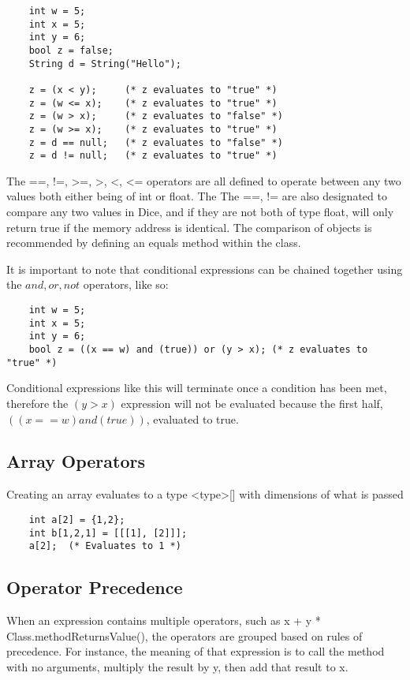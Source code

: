 \begin{homeworkProblem}
	\begin{verbatim}
	int w = 5;
	int x = 5;
	int y = 6;
	bool z = false;
	String d = String("Hello");
	
	z = (x < y);     (* z evaluates to "true" *)
	z = (w <= x);    (* z evaluates to "true" *)
	z = (w > x);     (* z evaluates to "false" *)
	z = (w >= x);    (* z evaluates to "true" *)
	z = d == null;   (* z evaluates to "false" *)
	z = d != null;   (* z evaluates to "true" *)
	\end{verbatim}
	
	The ==, !=, \textgreater=, \textgreater, \textless, \textless= operators are all defined to operate between any two values both either being of int or float. The The ==, != are also designated to compare any two values in Dice, and if they are not both of type float, will only return true if the memory address is identical. The comparison of objects is recommended by defining an equals method within the class. 
	
	It is important to note that conditional expressions can be chained together using the $and, or, not$ operators, like so:
	\begin{verbatim}
	int w = 5;
	int x = 5;
	int y = 6;
	bool z = ((x == w) and (true)) or (y > x); (* z evaluates to "true" *)
	\end{verbatim}
	
	Conditional expressions like this will terminate once a condition has been met, therefore the $(y>x)$ expression will not be evaluated because the first half, $((x == w) and (true))$, evaluated to true.
	
	\subsection{Array Operators}
	Creating an array evaluates to a type \textless type\textgreater[] with dimensions of what is passed
	\begin{verbatim}
	int a[2] = {1,2};
	int b[1,2,1] = [[[1], [2]]];
	a[2];  (* Evaluates to 1 *)
	\end{verbatim}
	
	\subsection{Operator Precedence}
	
	When an expression contains multiple operators, such as x + y * Class.methodReturnsValue(), the operators are grouped based on rules of precedence. For instance, the meaning of that expression is to call the method with no arguments, multiply the result by y, then add that result to x. 
	

\end{homeworkProblem}
